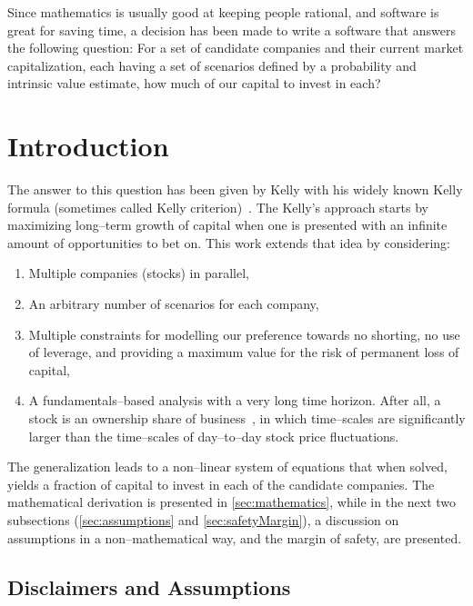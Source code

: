 \documentclass{article}
\begin{document}
Since mathematics is usually good at keeping people rational, and software is
great for saving time, a decision has been made to write a software that answers
the following question: For a set of candidate companies and their current
market capitalization, each having a set of scenarios defined by a probability
and intrinsic value estimate, how much of our capital to invest in each?

\section{Introduction}
\label{sec:introduction}

The answer to this question has been given by Kelly with his widely known Kelly
formula (sometimes called Kelly criterion)~\cite{kelly}. The Kelly's approach
starts by maximizing long--term growth of capital when one is presented with
an infinite amount of opportunities to bet on. This work extends that idea by
considering:
\begin{enumerate}
    \item Multiple companies (stocks) in parallel,
    \item An arbitrary number of scenarios for each company,
    \item Multiple constraints for modelling our preference towards no shorting,
    no use of leverage, and providing a maximum value for the risk of permanent
    loss of capital,
    \item A fundamentals--based analysis with a very long time horizon. After
    all, a stock is an ownership share of business~\cite{intelligentInvestor},
    in which time--scales are significantly larger than the time--scales of
    day--to--day stock price fluctuations.
\end{enumerate}

The generalization leads to a non--linear system of equations that when solved,
yields a fraction of capital to invest in each of the candidate companies. The
mathematical derivation is presented in \autoref{sec:mathematics}, while in the
next two subsections (\autoref{sec:assumptions} and \autoref{sec:safetyMargin}),
a discussion on assumptions in a non--mathematical way, and the margin of
safety, are presented.

\subsection{Disclaimers and Assumptions}
\label{sec:assumptions}
\end{document}

